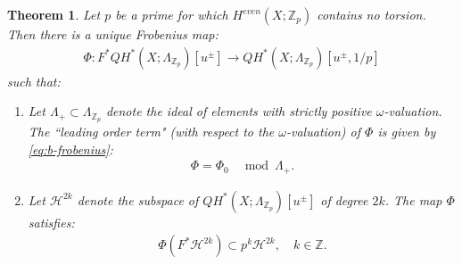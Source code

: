 \documentclass[10pt,a4paper]{amsart}
\newtheorem{thm}{Theorem}
\begin{document}
\begin{thm}\label{thm:integrality} Let $p$ be a prime for which $H^{even}(X;\mathbb{Z}_p)$ contains no torsion. Then there is a unique Frobenius map: \begin{align}\label{eq:Amodelcrystalline} \Phi: F^*QH^*(X; \Lambda_{\mathbb{Z}_p})[u^{\pm}] \to QH^*(X; \Lambda_{\mathbb{Z}_p})[u^{\pm},1/p] \end{align} such that: \begin{enumerate} \item Let $\Lambda_{+} \subset \Lambda_{\mathbb{Z}_{p}}$ denote the ideal of elements with strictly positive $\omega$-valuation. The ``leading order term" (with respect to the $\omega$-valuation) of $\Phi$ is given by \eqref{eq:b-frobenius}: \begin{align} \Phi = \Phi_0  \quad \operatorname{mod}\ \Lambda_{+}.\end{align}  \item Let $\mathcal{H}^{2k}$ denote the subspace of $QH^*(X; \Lambda_{\mathbb{Z}_p})[u^{\pm}]$ of degree $2k$. The map $\Phi$ satisfies:   \begin{align} \label{eq:keyintegralitycondition} \Phi(F^*\mathcal{H}^{2k}) \subset p^k\mathcal{H}^{2k},\quad k \in \mathbb{Z}.\end{align} \end{enumerate} \end{thm}
\end{document}
